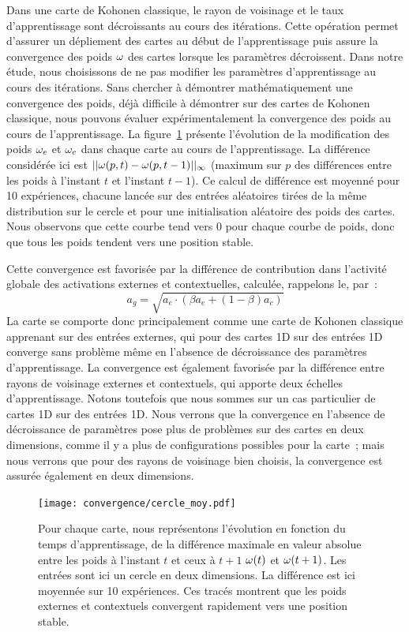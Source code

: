 \documentclass[../main]{subfiles}
\begin{document}
Dans une carte de Kohonen classique, le rayon de voisinage et le taux d'apprentissage sont décroissants au cours des itérations. Cette opération permet d'assurer un dépliement des cartes au début de l'apprentissage puis assure la convergence des poids $\omega$ des cartes lorsque les paramètres décroissent.
Dans notre étude, nous choisissons de ne pas modifier les paramètres d'apprentissage au cours des itérations.
Sans chercher à démontrer mathématiquement une convergence des poids, déjà difficile à démontrer sur des cartes de Kohonen classique, nous pouvons évaluer expérimentalement la convergence des poids au cours de l'apprentissage.
La figure~\ref{fig:conv} présente l'évolution de la modification des poids $\omega_{e}$ et $\omega_{c}$ dans chaque carte au cours de l'apprentissage. La différence considérée ici est $||\omega(p,t) - \omega(p,t-1)||_{\infty}$ (maximum sur $p$ des différences entre les poids à l'instant $t$ et l'instant $t-1$). Ce calcul de différence est moyenné pour 10 expériences, chacune lancée sur des entrées aléatoires tirées de la même distribution sur le cercle et pour une initialisation aléatoire des poids des cartes.
Nous observons que cette courbe tend vers $0$ pour chaque courbe de poids, donc que tous les poids tendent vers une position stable.

Cette convergence est favorisée par la différence de contribution dans l'activité globale des activations externes et contextuelles, calculée, rappelons le, par~: 
$$ a_g = \sqrt{a_e \cdot (\beta a_e + (1-\beta)a_c)}$$
La carte se comporte donc principalement comme une carte de Kohonen classique apprenant sur des entrées externes, qui pour des cartes 1D sur des entrées 1D converge sans problème même en l'absence de décroissance des paramètres d'apprentissage.
La convergence est également favorisée par la différence entre rayons de voisinage externes et contextuels, qui apporte deux échelles d'apprentissage.
Notons toutefois que nous sommes sur un cas particulier de cartes 1D sur des entrées 1D.
Nous verrons que la convergence en l'absence de décroissance de paramètres pose plus de problèmes sur des cartes en deux dimensions, comme il y a plus de configurations possibles pour la carte~; mais nous verrons que pour des rayons de voisinage bien choisis, la convergence est assurée également en deux dimensions.

\begin{figure}
	\texttt{[image: convergence/cercle\_moy.pdf]}
	\caption{Pour chaque carte, nous représentons l'évolution en fonction du temps d'apprentissage, de la différence maximale en valeur absolue entre les poids à l'instant $t$ et ceux à $t+1$ $\omega(t)$ et $\omega(t+1)$. Les entrées sont ici un cercle en deux dimensions. La différence est ici moyennée sur 10 expériences.
	Ces tracés montrent que les poids externes et contextuels convergent rapidement vers une position stable.\label{fig:conv}}
\end{figure}
\end{document}
